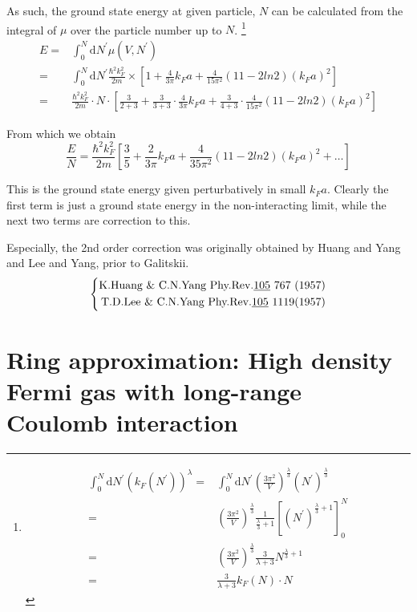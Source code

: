 As such, the ground state energy at given particle, $N$ can be calculated from the integral of $\mu$ over the particle number up to $N$.
\footnote{ \[ \begin{split} \int_0^N \mathrm{d}N^{'}(k_F(N^{'}))^\lambda =& \int_0^N \mathrm{d}N^{'}\left( \frac{3\pi^2}{V} \right)^{\frac{\lambda}{3}}(N^{'})^{\frac{\lambda}{3}}\\
=& \left( \frac{3\pi^2}{V} \right)^{\frac{\lambda}{3}} \frac{1}{\frac{\lambda}{3}+1}\left[ (N^{'})^{\frac{\lambda}{3}+1} \right]_0^N\\
=&\left( \frac{3\pi^2}{V} \right)^{\frac{\lambda}{3}} \frac{3}{\lambda+3}N^{\frac{\lambda}{3}+1}\\
=&\frac{3}{\lambda +3} k_F(N) \cdot N
\end{split} \]}
\[ \begin{split}
E=& \int_0^N \mathrm{d}N^{'} \mu(V,N^{'})\\
=&\int_0^N \mathrm{d}N^{'}\frac{\hbar^2 k_F^2}{2m} \times \left[ 1+\frac{4}{3\pi}k_F a + \frac{4}{15\pi^2}(11-2 ln2)(k_F a)^2 \right]\\
=&\frac{\hbar^2 k_F^2}{2m}\cdot N\cdot \left[ \frac{3}{2+3} + \frac{3}{3+3}\cdot\frac{4}{3\pi}k_F a + \frac{3}{4+3}\cdot\frac{4}{15\pi^2}(11-2 ln2)(k_F a)^2 \right]
\end{split}\]

From which we obtain
\begin{equation} \label{Eqs2.7.41}
\frac{E}{N} = \frac{\hbar^2 k_F^2}{2m}\left[ \frac{3}{5}+\frac{2}{3\pi}k_F a + \frac{4}{35\pi^2}(11-2 ln2)(k_F a)^2 + \ldots \right]
\end{equation}

This is the ground state energy given perturbatively in small $k_F a$. Clearly the first term is just a ground state energy in the non-interacting limit, while the next two terms are correction to this.

Especially, the 2nd order correction was originally obtained by Huang and Yang and Lee and Yang, prior to Galitskii.
\[ \left\{ \begin{split}
\text{K.Huang \& C.N.Yang Phy.Rev.\underline{105} 767 (1957)}\\
\text{T.D.Lee \& C.N.Yang Phy.Rev.\underline{105} 1119(1957)}
\end{split} \right. \]

\section{Ring approximation: High density Fermi gas with long-range Coulomb interaction}%

